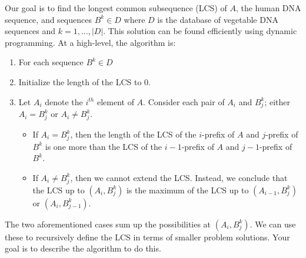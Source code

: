 \documentclass[12pt,letterpaper]{article}
\begin{document}
Our goal is to find the longest common subsequence (LCS) of $A$, the human DNA sequence, and sequences $B^k \in D$ where $D$ is the database of vegetable DNA sequences and $k=1,...,|D|$.
This solution can be found efficiently using dynamic programming. 
At a high-level, the algorithm is:
\begin{enumerate}
    \item For each sequence $B^k\in D$
    \item Initialize the length of the LCS to $0$.
    \item Let $A_i$ denote the $i^{th}$ element of $A$. 
    Consider each pair of $A_i$ and $B^k_j$; either $A_i=B^k_j$ or $A_i \neq B^k_j$.
    \begin{itemize}
        \item If $A_i=B^k_j$, then the length of the LCS of the $i$-prefix of $A$ and $j$-prefix of $B^k$ is one more than the LCS of the $i-1$-prefix of $A$ and $j-1$-prefix of $B^k$.
        \item If $A_i \neq B^k_j$, then we cannot extend the LCS. 
        Instead, we conclude that the LCS up to $(A_i,B^k_j)$ is the maximum of the LCS up to $(A_{i-1},B^k_j)$ or $(A_i,B^k_{j-1})$.
    \end{itemize}
\end{enumerate}
The two aforementioned cases sum up the possibilities at $(A_i,B^k_j)$.
We can use these to recursively define the LCS in terms of smaller problem solutions.
Your goal is to describe the algorithm to do this.
\newpage
\end{document}
